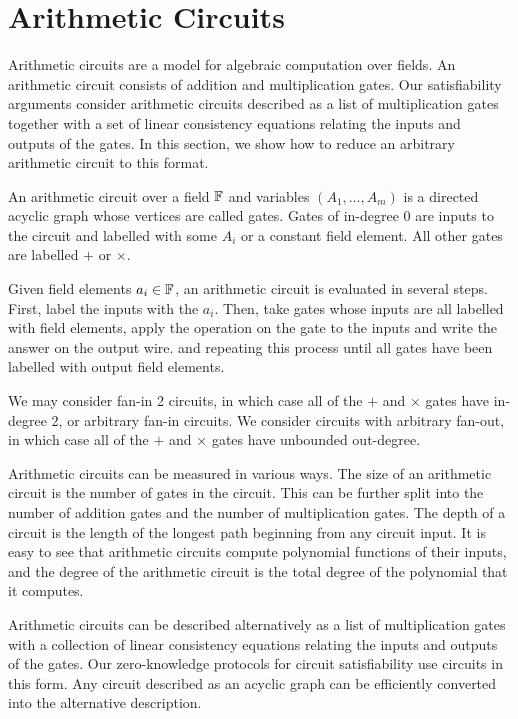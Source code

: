 \section{Arithmetic Circuits}\label{sec:AC}

Arithmetic circuits are a model for algebraic computation over fields. An arithmetic circuit consists of addition and multiplication gates. Our satisfiability arguments consider arithmetic circuits described as a list of multiplication gates together with a set of linear consistency equations relating the inputs and outputs of the gates. 
%
In this section, we show how to reduce an arbitrary arithmetic circuit to this format.

\begin{definition} An arithmetic circuit over a field $\mathbb{F}$ and variables $(A_1,\ldots,A_m)$ is a directed acyclic graph whose vertices are called gates. Gates of in-degree 0 are inputs to the circuit and labelled with some $A_i$ or a constant field element. All other gates are labelled $+$ or $\times$.
\end{definition}

Given field elements $a_i \in \mathbb{F}$, an arithmetic circuit is evaluated in several steps. First, label the inputs with the $a_i$. Then, take gates whose inputs are all labelled with field elements, apply the operation on the gate to the inputs and write the answer on the output wire. and repeating this process until all gates have been labelled with output field elements.

We may consider fan-in 2 circuits, in which case all of the $+$ and $\times$ gates have in-degree 2, or arbitrary fan-in circuits. We consider circuits with arbitrary fan-out, in which case all of the $+$ and $\times$ gates have unbounded out-degree.

Arithmetic circuits can be measured in various ways. The size of an arithmetic circuit is the number of gates in the circuit. This can be further split into the number of addition gates and the number of multiplication gates. The depth of a circuit is the length of the longest path beginning from any circuit input. It is easy to see that arithmetic circuits compute polynomial functions of their inputs, and the degree of the arithmetic circuit is the total degree of the polynomial that it computes.

Arithmetic circuits can be described alternatively as a list of multiplication gates with a collection of linear consistency equations relating the inputs and outputs of the gates. Our zero-knowledge protocols for circuit satisfiability use circuits in this form. Any circuit described as an acyclic graph can be efficiently converted into the alternative description.

